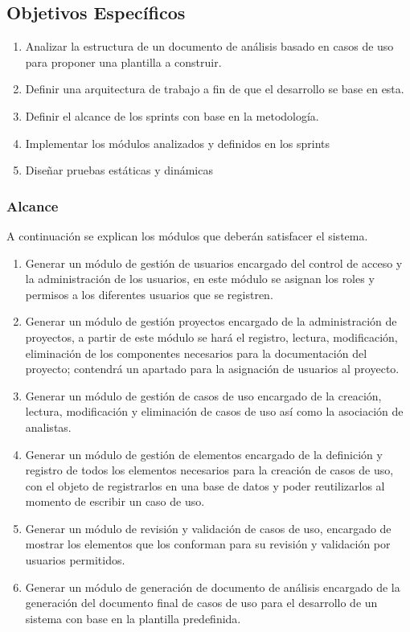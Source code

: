 \subsection{Objetivos Específicos}

\begin{enumerate}
	\item Analizar la estructura de un documento de análisis basado en casos de uso para proponer una plantilla a construir.
	\item Definir una arquitectura de trabajo a fin de que el desarrollo se base en esta.
	\item Definir el alcance de los sprints con base en la metodología.
	\item Implementar los módulos analizados y definidos en los sprints
	\item Diseñar pruebas estáticas y dinámicas
\end{enumerate}

\subsubsection{Alcance}

A continuación se explican los módulos que deberán satisfacer el sistema.

\begin{enumerate}
	\item Generar un módulo de gestión de usuarios encargado del control de acceso y la administración de los usuarios, en este módulo se asignan los roles y permisos a los diferentes usuarios que se registren.
	\item Generar un módulo de gestión proyectos encargado de la administración de proyectos, a partir de este módulo se hará el registro, lectura, modificación, eliminación de los componentes necesarios para la documentación del proyecto; contendrá un apartado para la asignación de usuarios al proyecto.
	\item Generar un módulo de gestión de casos de uso encargado de la creación, lectura, modificación y eliminación de casos de uso así como la asociación de analistas.
	\item Generar un módulo de gestión de elementos encargado de la definición y registro de todos los elementos necesarios para la creación de casos de uso, con el objeto de registrarlos en una base de datos y poder reutilizarlos al momento de escribir un caso de uso.
	\item Generar un módulo de revisión y validación de casos de uso, encargado de mostrar los elementos que los conforman para su revisión y validación por usuarios permitidos.
	\item Generar un módulo de generación de documento de análisis encargado de la generación del documento final de casos de uso para el desarrollo de un sistema con base en la plantilla predefinida.
\end{enumerate}

